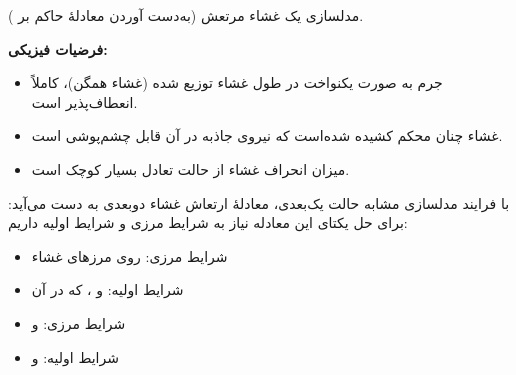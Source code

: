 \EMhold


\begin{EMunit}

مدلسازی یک غشاء مرتعش (به‌دست آوردن معادلهٔ حاکم بر ).

\textbf{فرضیات فیزیکی:}

\begin{itemize}
\tightlist
\item
  جرم به صورت یکنواخت در طول غشاء توزیع شده (غشاء همگن)، کاملاً انعطاف‌پذیر است.
\item
  غشاء چنان محکم کشیده شده‌است که نیروی جاذبه در آن قابل چشم‌پوشی است.
\item
  میزان انحراف غشاء از حالت تعادل بسیار کوچک است.
\end{itemize}


\end{EMunit}

\begin{EMunit}

با فرایند مدلسازی مشابه حالت یک‌بعدی، معادلهٔ ارتعاش غشاء دوبعدی به دست می‌آید:
برای حل یکتای این معادله نیاز به شرایط مرزی و شرایط اولیه داریم:

\begin{itemize}
\tightlist
\item
  شرایط مرزی:  روی مرزهای غشاء
\item
  شرایط اولیه:  و ، که در آن 
\end{itemize}

\end{EMunit}

\EMhold


\begin{EMunit}



\begin{itemize}
\tightlist
\item
  شرایط مرزی:  و 
\item
  شرایط اولیه:  و 
\end{itemize}

\end{EMunit}

